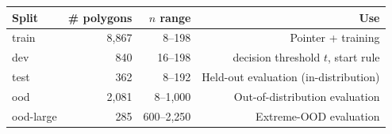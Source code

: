 \begin{tabular}{lrrr}
  \toprule
  Split & \# polygons & $n$ range & Use \\
  \midrule
  train     & 8{,}867 & 8--198       & Pointer + \SetPredictor{} training \\
  dev       & 840     & 16--198      & \SetPredictor{} decision threshold $t$, start rule \\
  test      & 362     & 8--192       & Held-out evaluation (in-distribution) \\
  ood       & 2{,}081 & 8--1{,}000   & Out-of-distribution evaluation \\
  ood-large & 285     & 600--2{,}250 & Extreme-OOD evaluation \\
  \bottomrule
\end{tabular}
